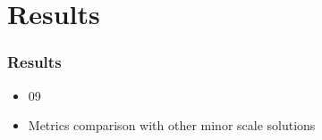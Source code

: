 \section{Results}

\begin{frame}%
\frametitle{Results}

\begin{itemize}
  \item 09
  \item Metrics comparison with other minor scale solutions
\end{itemize}

\end{frame}